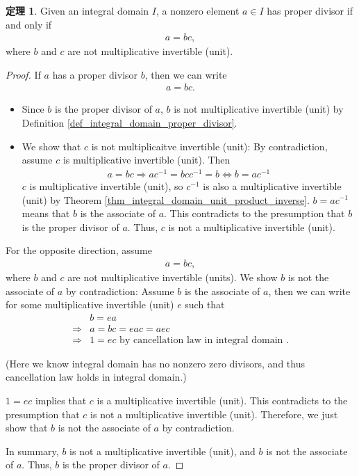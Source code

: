 \documentclass[utf8]{ctexbook}
\theoremstyle{definition}
\newtheorem{prototheorem}{定理}[section]
\newenvironment{theorem}
   {\colorlet{shadecolor}{red!30}\begin{shaded}\begin{prototheorem}}
   {\end{prototheorem}\end{shaded}}
\begin{document}
\begin{theorem}\label{thm_integral_domain_proper_divisor_redef}
Given an integral domain $I$, a nonzero element $a \in I$ has proper divisor if and only if
\begin{align*}
a = b c ,
\end{align*}
where $b$ and $c$ are not multiplicative invertible (unit).
\end{theorem}

\begin{proof}
If $a$ has a proper divisor $b$, then we can write
\begin{align*}
a = bc .
\end{align*}
\begin{itemize}
\item{Since $b$ is the proper divisor of $a$, $b$ is not multiplicative invertible (unit) by Definition \ref{def_integral_domain_proper_divisor}. }
\item{We show that $c$ is not multiplicaitve invertible (unit): By contradiction, assume $c$ is multiplicative invertible (unit). Then 
\begin{align*}
a = bc \Longrightarrow a c^{-1} = b c c^{-1} = b \Longleftrightarrow b = a c^{-1}
\end{align*} 
$c$ is multiplicative invertible (unit), so $c^{-1}$ is also a multiplicative invertible (unit) by Theorem  \ref{thm_integral_domain_unit_product_inverse}. $b = a c^{-1}$ means that $b$ is the associate of $a$. This contradicts to the presumption that $b$ is the proper divisor of $a$. Thus, $c$ is not a multiplicative invertible (unit).}
\end{itemize}

For the opposite direction, assume
\begin{align*}
a = bc ,
\end{align*}
where $b$ and $c$ are not multiplicative invertible (units). We show $b$ is not the associate of $a$ by contradiction: Assume $b$ is the associate of $a$, then we can write for some multiplicative invertible (unit) $e$ such that
\begin{align*}
& b = e a \\
 \Longrightarrow & a = bc = e a c = a ec \\
\Longrightarrow & 1 = ec \mbox{ by cancellation law in integral domain } .
\end{align*}

(Here we know integral domain has no nonzero zero divisors, and thus cancellation law holds in integral domain.)

$1 = ec $ implies that $c$ is a multiplicative invertible (unit). This contradicts to the presumption that $c$ is not a multiplicative invertible (unit). Therefore, we just show that $b$ is not the associate of $a$ by contradiction.

In summary, $b$ is not a multiplicative invertible (unit), and $b$ is not the associate of $a$. Thus, $b$ is the proper divisor of $a$.
\end{proof}
\end{document}
